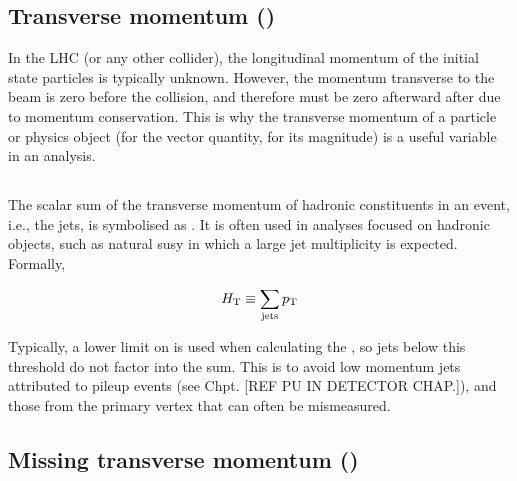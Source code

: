 

\subsection{Transverse momentum (\texorpdfstring{\pt}{pt})}
\label{subsec:theory_pt}

In the LHC (or any other collider), the longitudinal momentum of the initial state particles is typically unknown. However, the momentum transverse to the beam is zero before the collision, and therefore must be zero afterward after due to momentum conservation. This is why the transverse momentum of a particle or physics object (\ptvec for the vector quantity, \pt for its magnitude) is a useful variable in an analysis.





\subsection{\texorpdfstring{\HT}{HT}}
\label{subsec:theory_ht}


The scalar sum of the transverse momentum of hadronic constituents in an event, i.e., the \glspl{jet}, is symbolised as \HT. It is often used in analyses focused on hadronic objects, such as natural \acrlong{susy} in which a large jet multiplicity is expected. Formally,

\begin{equation}
    H_{\mathrm{T}} \equiv \sum_{\mathrm{jets}} p_{\mathrm{T}}
    \label{eq:ht_definition}
\end{equation}

Typically, a lower limit on \pt is used when calculating the \HT, so jets below this threshold do not factor into the sum. This is to avoid low momentum jets attributed to pileup events (see Chpt. [REF PU IN DETECTOR CHAP.]), and those from the primary vertex that can often be mismeasured.




\subsection{Missing transverse momentum (\texorpdfstring{\ptmiss}{ptmiss})}
\label{subsec:theory_met}

